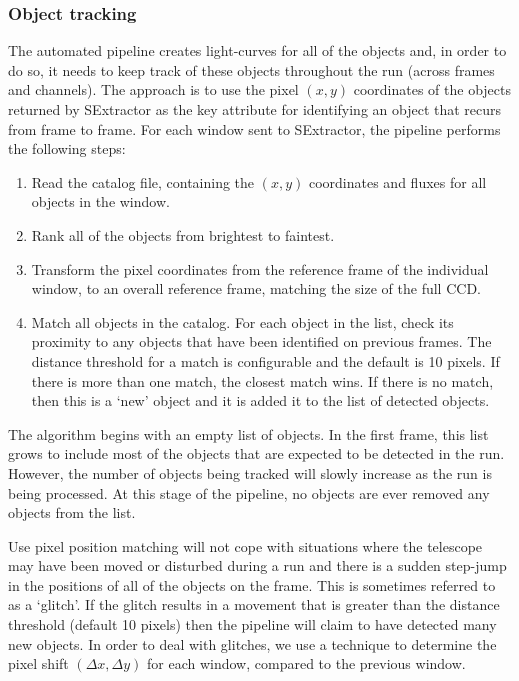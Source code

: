 \subsubsection{Object tracking}
The automated pipeline creates light-curves for all of the objects and, in order to do so, it needs to keep track of these objects throughout the run (across frames and channels). The approach is to use the pixel $(x, y)$ coordinates of the objects returned by SExtractor as the key attribute for identifying an object that recurs from frame to frame. For each window sent to SExtractor, the pipeline performs the following steps:
\begin{enumerate}
  \item{Read} the catalog file, containing the $(x, y)$ coordinates and fluxes for all objects in the window.
  \item{Rank} all of the objects from brightest to faintest.
  \item{Transform} the pixel coordinates from the reference frame of the individual window, to an overall reference frame, matching the size of the full CCD. 
  \item{Match} all objects in the catalog. For each object in the list, check its proximity to any objects that have been identified on previous frames. The distance threshold for a match is configurable and the default is 10 pixels. If there is more than one match, the closest match wins. If there is no match, then this is a `new' object and it is added it to the list of detected objects.  
\end{enumerate}

The algorithm begins with an empty list of objects. In the first frame, this list grows to include most of the objects that are expected to be detected in the run. However, the number of objects being tracked will slowly increase as the run is being processed. At this stage of the pipeline, no objects are ever removed any objects from the list. 

Use pixel position matching will not cope with situations where the telescope may have been moved or disturbed during a run and there is a sudden step-jump in the positions of all of the objects on the frame. This is sometimes referred to as a `glitch'. If the glitch results in a movement that is greater than the distance threshold (default 10 pixels) then the pipeline will claim to have detected many new objects. In order to deal with glitches, we use a technique to determine the pixel shift $(\Delta x, \Delta y)$ for each window, compared to the previous window. 

